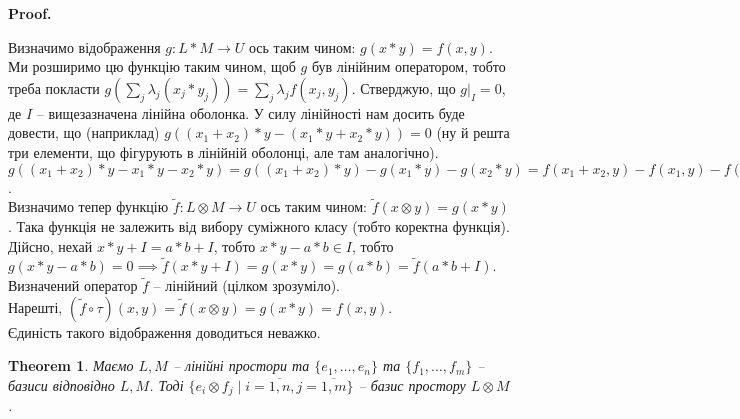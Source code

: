 \documentclass[a4paper, 10pt]{article}
\makeatletter
\theoremstyle{theoremdd}
\newtheorem{theorem}{Theorem}[subsection]
\renewenvironment{proof}[1][Proof.\\]{\par
\pushQED{\hfill \qed}%
\normalfont \topsep6\p@\@plus6\p@\relax
\trivlist
\item\relax
{\bfseries
#1\@addpunct{.}}\hspace\labelsep\ignorespaces
}{%
\popQED\endtrivlist\@endpefalse
}
\makeatother
\begin{document}
\begin{proof}
Визначимо відображення $g \colon L*M \to U$ ось таким чином: $g(x*y) = f(x,y)$. Ми розширимо цю функцію таким чином, щоб $g$ був лінійним оператором, тобто треба покласти $\displaystyle g\left( \sum_j \lambda_j (x_j*y_j) \right) = \sum_j \lambda_j f(x_j,y_j)$. Стверджую, що $g|_I = 0$, де $I$ -- вищезазначена лінійна оболонка. У силу лінійності нам досить буде довести, що (наприклад) $g((x_1+x_2)*y - (x_1*y + x_2*y)) = 0$ (ну й решта три елементи, що фігурують в лінійній оболонці, але там аналогічно).\\
$g((x_1+x_2)*y - x_1*y - x_2*y) = g((x_1+x_2)*y) - g(x_1*y) - g(x_2*y) = f(x_1+x_2,y) - f(x_1,y) - f(x_2,y) = 0$.\\
Визначимо тепер функцію $\tilde{f} \colon L \otimes M \to U$ ось таким чином: $\tilde{f}(x \otimes y) = g(x*y)$. Така функція не залежить від вибору суміжного класу (тобто коректна функція). Дійсно, нехай $x*y+I = a*b+I$, тобто $x*y-a*b \in I$, тобто $g(x*y-a*b) = 0 \implies \tilde{f}(x*y+I) = g(x*y) = g(a*b) = \tilde{f}(a*b+I)$.\\
Визначений оператор $\tilde{f}$ -- лінійний (цілком зрозуміло).\\
Нарешті, $(\tilde{f} \circ \tau)(x,y) = \tilde{f}(x \otimes y) = g(x*y) = f(x,y)$.\\
Єдиність такого відображення доводиться неважко.
\end{proof}

\begin{theorem}
Маємо $L,M$ -- лінійні простори та $\{e_1,\dots,e_n\}$ та $\{f_1,\dots,f_m\}$ -- базиси відповідно $L,M$. Тоді $\{ e_i \otimes f_j \mid i = \overline{1,n}, j = \overline{1,m} \}$ -- базис простору $L \otimes M$.
\end{theorem}
\end{document}
